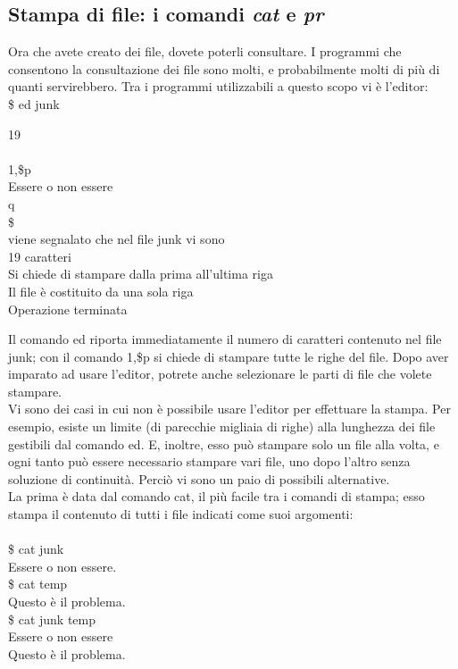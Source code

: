 \subsection{Stampa di file: i comandi \textit{cat} e \textit{pr}}
Ora che avete creato dei file, dovete poterli consultare. I programmi che consentono
la consultazione dei file sono molti, e probabilmente molti di più di quanti servirebbero.
Tra i programmi utilizzabili a questo scopo vi è l'editor:\\
\$ ed junk
\begin{multicols}{2}
	19\\\\
	1,\$p\\
	Essere o non essere\\
	q\\
	\$\\
	viene segnalato che nel file junk vi sono\\
	19 caratteri\\
	Si chiede di stampare dalla prima all'ultima riga\\
	Il file è costituito da una sola riga\\
	Operazione terminata
\end{multicols}
Il comando ed riporta immediatamente il numero di caratteri contenuto nel file junk;
con il comando 1,\$p si chiede di stampare tutte le righe del file. Dopo aver imparato
ad usare l'editor, potrete anche selezionare le parti di file che volete stampare.\\
Vi sono dei casi in cui non è possibile usare l'editor per effettuare la stampa. Per
esempio, esiste un limite (di parecchie migliaia di righe) alla lunghezza dei file gestibili
 dal comando ed. E, inoltre, esso può stampare solo un file alla volta, e ogni tanto
può essere necessario stampare vari file, uno dopo l'altro senza soluzione di continuità.
 Perciò vi sono un paio di possibili alternative.\\
La prima è data dal comando cat, il più facile tra i comandi di stampa; esso stampa
il contenuto di tutti i file indicati come suoi argomenti:\\\\
\$ cat junk\\
Essere o non essere.\\
\$ cat temp\\
Questo è il problema.\\
\$ cat junk temp\\
Essere o non essere\\
Questo è il problema.\\\\
